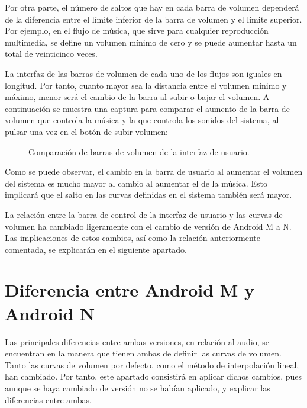 Por otra parte, el número de saltos que hay en cada barra de volumen dependerá de la diferencia entre el límite inferior de la barra de volumen y el límite superior. Por ejemplo, en el flujo de música, que sirve para cualquier reproducción multimedia, se define un volumen mínimo de cero y se puede aumentar hasta un total de veinticinco veces.

La interfaz de las barras de volumen de cada uno de los flujos son iguales en longitud. Por tanto, cuanto mayor sea la distancia entre el volumen mínimo y máximo, menor será el cambio de la barra al subir o bajar el volumen. A continuación se muestra una captura para comparar el aumento de la barra de volumen que controla la música y la que controla los sonidos del sistema, al pulsar una vez en el botón de subir volumen:

\begin{figure}[H]
	\centering
	\break
	\caption{Comparación de barras de volumen de la interfaz de usuario.} \label{fig:volume_compare_ui}
\end{figure}

Como se puede observar, el cambio en la barra de usuario al aumentar el volumen del sistema es mucho mayor al cambio al aumentar el de la música. Esto implicará que el salto en las curvas definidas en el sistema también será mayor.

La relación entre la barra de control de la interfaz de usuario y las curvas de volumen ha cambiado ligeramente con el cambio de versión de Android M a N. Las implicaciones de estos cambios, así como la relación anteriormente comentada, se explicarán en el siguiente apartado.

\section{Diferencia entre Android M y Android N} \label{sec:dif_N_M}
Las principales diferencias entre ambas versiones, en relación al audio, se encuentran en la manera que tienen ambas de definir las curvas de volumen. Tanto las curvas de volumen por defecto, como el método de interpolación lineal, han cambiado. Por tanto, este apartado consistirá en aplicar dichos cambios, pues aunque se haya cambiado de versión no se habían aplicado, y explicar las diferencias entre ambas.

